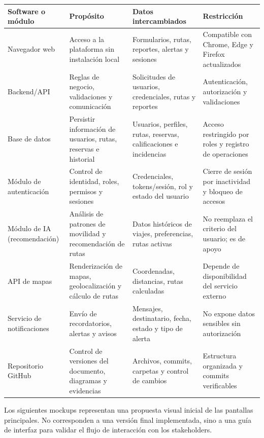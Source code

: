 \documentclass[11pt,a4paper]{article}
\begin{document}
\vspace{6pt}
\noindent
\begin{tabular}{|>{\raggedright\arraybackslash}p{3cm}|>{\raggedright\arraybackslash}p{3.5cm}|>{\raggedright\arraybackslash}p{3.5cm}|>{\raggedright\arraybackslash}p{2.2cm}|}
\hline
\rowcolor{uteqgreen!40} \textbf{Software o módulo} & \textbf{Propósito} & \textbf{Datos intercambiados} & \textbf{Restricción} \\
\hline
Navegador web & Acceso a la plataforma sin instalación local & Formularios, rutas, reportes, alertas y sesiones & Compatible con Chrome, Edge y Firefox actualizados \\
\hline
Backend/API & Reglas de negocio, validaciones y comunicación & Solicitudes de usuarios, credenciales, rutas y reportes & Autenticación, autorización y validaciones \\
\hline
Base de datos & Persistir información de usuarios, rutas, reservas e historial & Usuarios, perfiles, rutas, reservas, calificaciones e incidencias & Acceso restringido por roles y registro de operaciones \\
\hline
Módulo de autenticación & Control de identidad, roles, permisos y sesiones & Credenciales, tokens/sesión, rol y estado del usuario & Cierre de sesión por inactividad y bloqueo de accesos \\
\hline
Módulo de IA (recomendación) & Análisis de patrones de movilidad y recomendación de rutas & Datos históricos de viajes, preferencias, rutas activas & No reemplaza el criterio del usuario; es de apoyo \\
\hline
API de mapas & Renderización de mapas, geolocalización y cálculo de rutas & Coordenadas, distancias, rutas calculadas & Depende de disponibilidad del servicio externo \\
\hline
Servicio de notificaciones & Envío de recordatorios, alertas y avisos & Mensajes, destinatario, fecha, estado y tipo de alerta & No expone datos sensibles sin autorización \\
\hline
Repositorio GitHub & Control de versiones del documento, diagramas y evidencias & Archivos, commits, carpetas y control de cambios & Estructura organizada y commits verificables \\
\hline
\end{tabular}

\vspace{12pt}
Los siguientes mockups representan una propuesta visual inicial de las pantallas principales. No corresponden a una versión final implementada, sino a una guía de interfaz para validar el flujo de interacción con los stakeholders.
\end{document}
